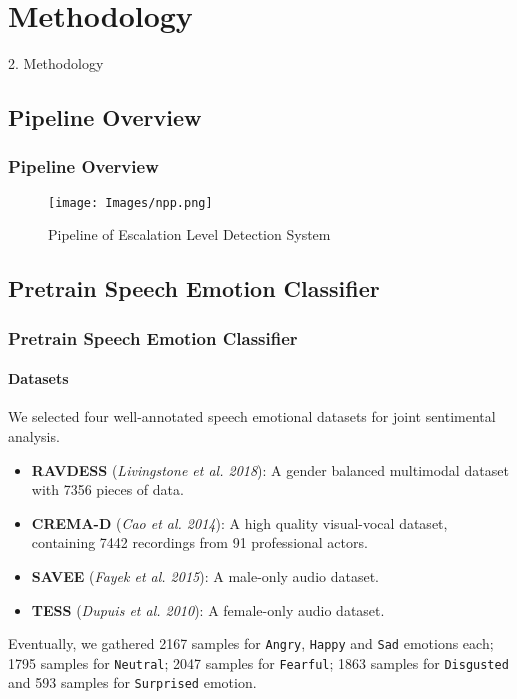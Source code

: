 \documentclass[
	11pt, %
]{beamer}
\begin{document}

\section{Methodology}

\begin{frame}
\begin{center}
    \Huge 2. Methodology
\end{center}
    
\end{frame}

\subsection{Pipeline Overview}

\begin{frame}
	\frametitle{Pipeline Overview}

    \begin{figure}
		\texttt{[image: Images/npp.png]}
		\caption{Pipeline of Escalation Level Detection System}
	\end{figure}

\end{frame}


\subsection{Pretrain Speech Emotion Classifier}

\begin{frame}
	\frametitle{Pretrain Speech Emotion Classifier}
	\framesubtitle{Datasets}
	We selected four well-annotated speech emotional datasets for joint sentimental analysis.
	\begin{itemize}
	    \item \textbf{RAVDESS} (\emph{Livingstone et al. 2018}): A gender balanced multimodal dataset with 7356 pieces of data.
	    \item \textbf{CREMA-D} (\emph{Cao et al. 2014}): A high quality visual-vocal dataset, containing 7442 recordings from 91 professional actors.
	    \item \textbf{SAVEE} (\emph{Fayek et al. 2015}): A male-only audio dataset.
	    \item \textbf{TESS} (\emph{Dupuis et al. 2010}): A female-only audio dataset.
	\end{itemize}
	Eventually, we gathered 2167 samples for \texttt{Angry}, \texttt{Happy} and \texttt{Sad} emotions each; 1795 samples for \texttt{Neutral}; 2047 samples for \texttt{Fearful}; 1863 samples for \texttt{Disgusted} and 593 samples for \texttt{Surprised} emotion.

\end{frame}
\end{document}
